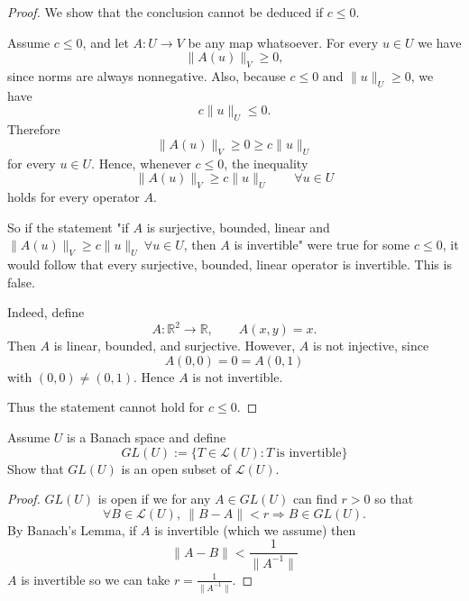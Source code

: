 \begin{proof}
    We show that the conclusion cannot be deduced if $c\le 0$.

    Assume $c\le 0$, and let $A:U\to V$ be any map whatsoever. 
    For every
    $u\in U$ we have
    \[
        \|A(u)\|_V \ge 0,
    \]
    since norms are always nonnegative. Also, because $c\le 0$ and
    $\|u\|_U\ge 0$, we have
    \[
        c\|u\|_U \le 0.
    \]
    Therefore
    \[
        \|A(u)\|_V \ge 0 \ge c\|u\|_U
    \]
    for every $u\in U$. Hence, whenever $c\le 0$, the inequality
    \[
        \|A(u)\|_V \ge c\|u\|_U \qquad \forall u\in U
    \]
    holds for every operator $A$.

    So if the statement
    "if $A$ is surjective, bounded, linear and $\|A(u)\|_V \geq 
    c\|u\|_U \ \forall u \in U$, then $A$ is invertible"
    were true for some $c\le 0$, it would follow that every 
    surjective,
    bounded, linear operator is invertible. This is false.

    Indeed, define
    \[
        A:\mathbb{R}^2\to\mathbb{R}, \qquad A(x,y)=x.
    \]
    Then $A$ is linear, bounded, and surjective. However, $A$ is not
    injective, since
    \[
        A(0,0)=0=A(0,1)
    \]
    with $(0,0)\neq(0,1)$. Hence $A$ is not invertible.

    Thus the statement cannot hold for $c\le 0$.
\end{proof}

\begin{prob}
    Assume $U$ is a Banach space and define 
    \[
        GL(U) := \{T \in \mathcal L(U) : T \ \text{is invertible}\}
    \]
    Show that $GL(U)$ is an open subset of $\mathcal L(U)$.
\end{prob}
\begin{proof}
    $GL(U)$ is open if we for any $A \in GL(U)$ can find 
    $r > 0$ so that 
    \[
        \forall B \in \mathcal L(U), \ 
        \|B-A\| < r \Rightarrow B \in GL(U).
    \]
    By Banach's Lemma, if $A$ is invertible (which we assume) 
    then 
    \[
        \|A-B\| < \frac{1}{\|A^{-1}\|}
    \]
    $A$ is invertible so we can take $r = \frac{1}{\|A^{-1}\|}$.
\end{proof}


